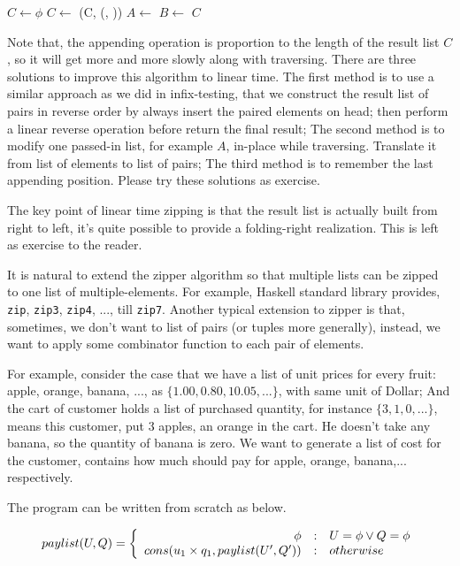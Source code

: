 \documentclass[b5paper]{article}
\begin{document}
\begin{algorithmic}[1]
  \State $C \gets \phi$
    \State $C \gets $ (C, (, ))
    \State $A \gets$ 
    \State $B \gets$ 
  \EndWhile
  \State \Return $C$
\EndFunction
\end{algorithmic}

Note that, the appending operation is proportion to the length of the result list $C$, so it will get
more and more slowly along with traversing. There are three solutions to improve this algorithm to
linear time. The first method is to use a similar approach as we did in infix-testing, that we construct
the result list of pairs in reverse order by always insert the paired elements on head; then perform
a linear reverse operation before return the final result; The second method is to modify one passed-in
list, for example $A$, in-place while traversing. Translate it from list of elements to list of pairs;
The third method is to remember the last appending position. Please try these solutions as exercise.

The key point of linear time zipping is that the result list is actually built from right to left, it's quite possible to provide a folding-right realization.
This is left as exercise to the reader.

It is natural to extend the zipper algorithm so that multiple lists can be zipped to one list of multiple-elements.
For example, Haskell standard library provides, \texttt{zip}, \texttt{zip3}, \texttt{zip4}, ..., till \texttt{zip7}.
Another typical extension to zipper is that, sometimes, we don't want to list of pairs (or tuples
more generally), instead, we want to apply some combinator function to each pair of elements.

For example, consider the case that we have a list of unit prices for every fruit: apple, orange, banana, ...,
 as $\{1.00, 0.80, 10.05, ...\}$, with same unit of Dollar; And the cart of customer holds a list
of purchased quantity, for instance $\{3, 1, 0, ...\}$, means this customer, put 3 apples, an orange in the
cart. He doesn't take any banana, so the quantity of banana is zero. We want to generate a list of cost for the
customer, contains how much should pay for apple, orange, banana,... respectively.

The program can be written from scratch as below.

\[
paylist(U, Q) =  \left \{
  \begin{array}
  {r@{\quad:\quad}l}
  \phi & U = \phi \lor Q = \phi \\
  cons(u_1 \times q_1, paylist(U', Q')) & otherwise
  \end{array}
\right.
\]
\end{document}
